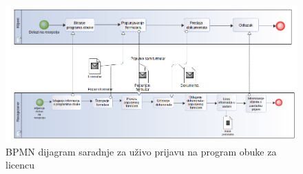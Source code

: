 \documentclass[../../main.tex]{subfiles}
\begin{document}
\newpage
\begin{figure}[!ht]
\begin{center}
\includegraphics[scale=0.45]{sections/images/bpmn_dijagram_saradnje_prijava_za_licencu.png}
\end{center}
\caption{BPMN dijagram saradnje za uživo prijavu na program obuke za licencu}
\label{fig:kontekst}
\end{figure}
\end{document}
